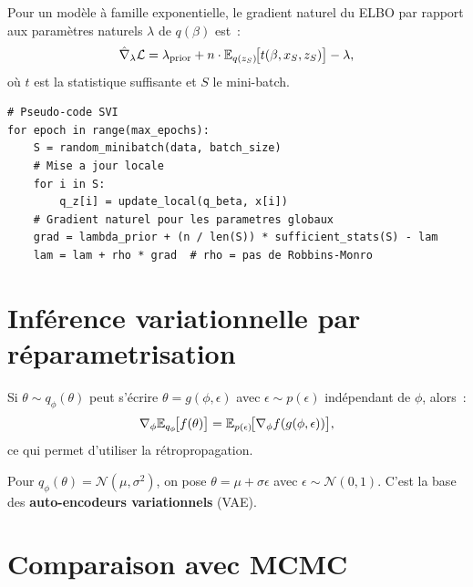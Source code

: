 \begin{proposition}
Pour un mod\`ele \`a famille exponentielle, le gradient naturel du ELBO
par rapport aux param\`etres naturels $\lambda$ de $q(\beta)$ est~:
\[
  \hat{\nabla}_\lambda \mathcal{L} = \lambda_{\mathrm{prior}} + n \cdot
  \mathbb{E}_{q(z_S)}\!\bigl[t(\beta, x_S, z_S)\bigr] - \lambda,
\]
o\`u $t$ est la statistique suffisante et $S$ le mini-batch.
\end{proposition}

\begin{verbatim}
# Pseudo-code SVI
for epoch in range(max_epochs):
    S = random_minibatch(data, batch_size)
    # Mise a jour locale
    for i in S:
        q_z[i] = update_local(q_beta, x[i])
    # Gradient naturel pour les parametres globaux
    grad = lambda_prior + (n / len(S)) * sufficient_stats(S) - lam
    lam = lam + rho * grad  # rho = pas de Robbins-Monro
\end{verbatim}

\section{Inf\'erence variationnelle par r\'eparametrisation}

\begin{definition}
Si $\theta \sim q_\phi(\theta)$ peut s'\'ecrire $\theta = g(\phi, \epsilon)$
avec $\epsilon \sim p(\epsilon)$ ind\'ependant de $\phi$, alors~:
\[
  \nabla_\phi \mathbb{E}_{q_\phi}\!\bigl[f(\theta)\bigr]
  = \mathbb{E}_{p(\epsilon)}\!\bigl[\nabla_\phi f(g(\phi, \epsilon))\bigr],
\]
ce qui permet d'utiliser la r\'etropropagation.
\end{definition}

\begin{exemple}
Pour $q_\phi(\theta) = \mathcal{N}(\mu, \sigma^2)$, on pose
$\theta = \mu + \sigma \epsilon$ avec $\epsilon \sim \mathcal{N}(0,1)$.
C'est la base des \textbf{auto-encodeurs variationnels} (VAE).
\end{exemple}

\section{Comparaison avec MCMC}


